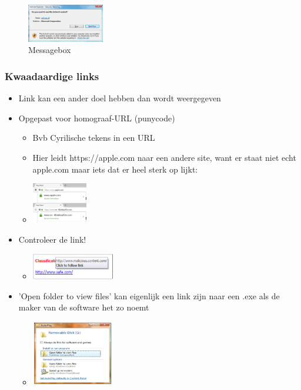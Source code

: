 \documentclass{article}
\begin{document}
\begin{figure}[H]
    \centering
    \includegraphics[width=0.3\textwidth]{messagebox.png}
    \caption{Messagebox}
\end{figure}

\subsubsection{Kwaadaardige links}

\begin{itemize}
    \item Link kan een ander doel hebben dan wordt weergegeven
    \item Opgepast voor homograaf-URL (punycode)
    \begin{itemize}
        \item Bvb Cyrilische tekens in een URL
        \item Hier leidt https://apple.com naar een andere site, want er staat niet echt apple.com maar iets dat er heel sterk op lijkt:
        \item \includegraphics[width=0.2\textwidth]{link2.png}
    \end{itemize}
    \item Controleer de link! 
    \begin{itemize}
        \item \includegraphics[width=0.3\textwidth]{link.png}
    \end{itemize}
    \item 'Open folder to view files' kan eigenlijk een link zijn naar een .exe als de maker van de software het zo noemt
    \begin{itemize}
        \item \includegraphics[width=0.3\textwidth]{open-folder.png}
    \end{itemize}
\end{itemize}
\end{document}
